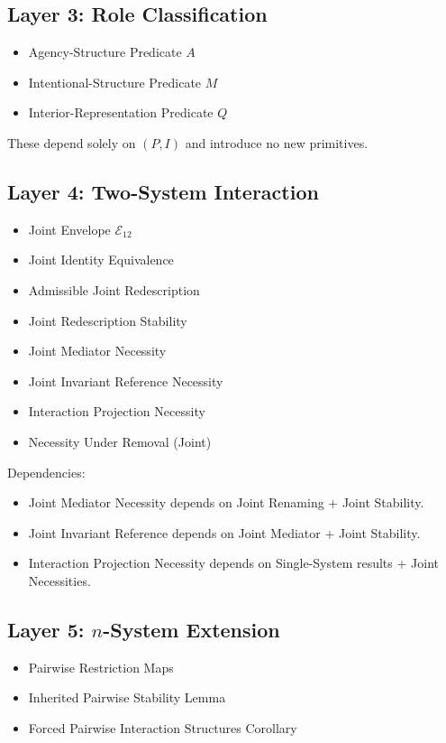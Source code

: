 \documentclass[11pt]{article}
\theoremstyle{definition}
\begin{document}
\subsection*{Layer 3: Role Classification}

\begin{itemize}
    \item Agency-Structure Predicate $A$
    \item Intentional-Structure Predicate $M$
    \item Interior-Representation Predicate $Q$
\end{itemize}

These depend solely on $(P,I)$ and introduce no new primitives.

\subsection*{Layer 4: Two-System Interaction}

\begin{itemize}
    \item Joint Envelope $\mathcal{E}_{12}$
    \item Joint Identity Equivalence
    \item Admissible Joint Redescription
    \item Joint Redescription Stability
    \item Joint Mediator Necessity
    \item Joint Invariant Reference Necessity
    \item Interaction Projection Necessity
    \item Necessity Under Removal (Joint)
\end{itemize}

Dependencies:
\begin{itemize}
    \item Joint Mediator Necessity depends on Joint Renaming + Joint Stability.
    \item Joint Invariant Reference depends on Joint Mediator + Joint Stability.
    \item Interaction Projection Necessity depends on Single-System results + Joint Necessities.
\end{itemize}

\subsection*{Layer 5: $n$-System Extension}

\begin{itemize}
    \item Pairwise Restriction Maps
    \item Inherited Pairwise Stability Lemma
    \item Forced Pairwise Interaction Structures Corollary
\end{itemize}
\end{document}
